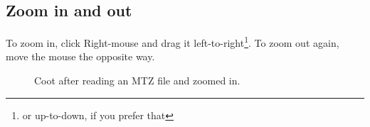 \documentclass{article}
\begin{document}
\subsection{Zoom in and out}
To zoom in, click Right-mouse and drag it left-to-right\footnote{or
  up-to-down, if you prefer that}. To zoom out again, move the mouse
the opposite way.

\begin{figure}[htbp]
  \begin{center}
    \leavevmode
    \epsfxsize 70mm
    \caption{Coot after reading an MTZ file and zoomed in.}
    \label{fig:map_screenshot}
  \end{center}
\end{figure}
\end{document}
